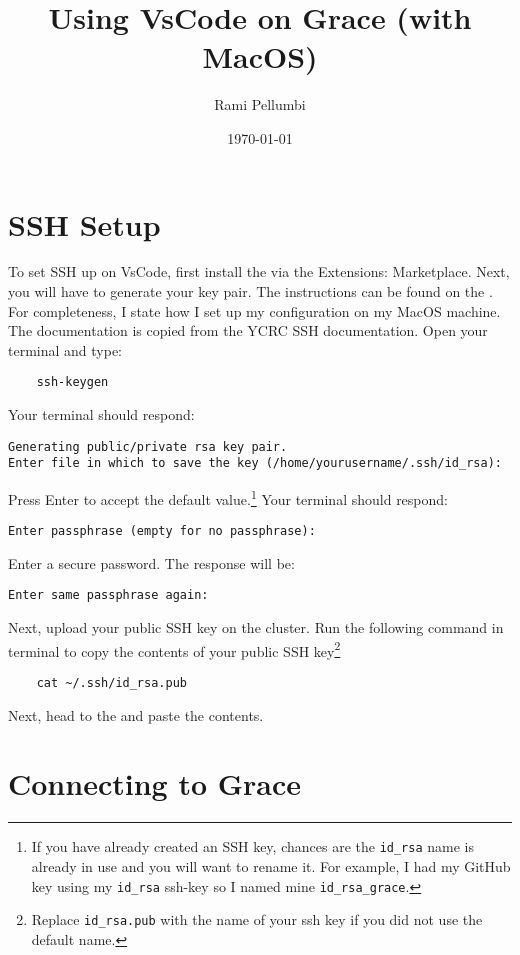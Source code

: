 \documentclass{article}
\title{Using VsCode on Grace (with MacOS)}
\author{Rami Pellumbi}
\date{\today}
\newcommand{\MYhref}[3][blue]{\href{#2}{\color{#1}{#3}}}%
\begin{document}
\maketitle

\section{SSH Setup}

To set SSH up on VsCode, first install the \MYhref{https://marketplace.visualstudio.com/items?itemName=ms-vscode-remote.remote-ssh}{Remote - SSH exension from Microsoft} 
via the Extensions: Marketplace. Next, you will have to generate your key pair. The instructions can be found 
on the \MYhref{https://docs.ycrc.yale.edu/clusters-at-yale/access/ssh/}{YCRC SSH docs}. For completeness, I state how I 
set up my configuration on my MacOS machine. The documentation is copied from the YCRC SSH documentation. Open your terminal and type:
\begin{verbatim}
    ssh-keygen    
\end{verbatim}
Your terminal should respond:
\begin{verbatim}
Generating public/private rsa key pair.
Enter file in which to save the key (/home/yourusername/.ssh/id_rsa):
\end{verbatim}
Press Enter to accept the default value.\footnote{If you have already created an SSH key, chances are the \texttt{id\_rsa} name is already in use and you will want to rename it. For example, 
I had my GitHub key using my \texttt{id\_rsa} ssh-key so I named mine \texttt{id\_rsa\_grace}.}
Your terminal should respond:
\begin{verbatim}
Enter passphrase (empty for no passphrase):
\end{verbatim}
Enter a secure password. The response will be:
\begin{verbatim}
Enter same passphrase again:
\end{verbatim}
Next, upload your public SSH key on the cluster. Run the following command in terminal to copy the contents of 
your public SSH key\footnote{Replace \texttt{id\_rsa.pub} with the name of your ssh key if you did not use the default name.}
\begin{verbatim}
    cat ~/.ssh/id_rsa.pub
\end{verbatim}
Next, head to the \MYhref{https://sshkeys.ycrc.yale.edu/}{SSH key uploader} and paste the contents.

\section{Connecting to Grace}
\end{document}
